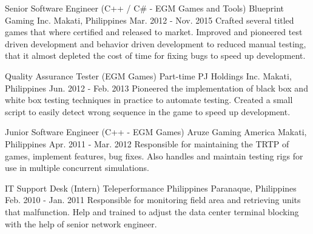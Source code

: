 \begin{cventries}
    \cventry
        {Senior Software Engineer (C++ / C\# - EGM Games and Tools)}
        {Blueprint Gaming Inc.}
        {Makati, Philippines}
        {Mar. 2012 - Nov. 2015}
        {Crafted several titled games that where certified and released to market. Improved and pioneered test driven development and behavior driven development to reduced manual testing, that it almost depleted the cost of time for fixing bugs to speed up development.}
        
    \cventry
        {Quality Assurance Tester (EGM Games) Part-time}
        {PJ Holdings Inc.}
        {Makati, Philippines}
        {Jun. 2012 - Feb. 2013}
        {Pioneered the implementation of black box and white box testing techniques in practice to automate testing. Created a small script to easily detect wrong sequence in the game to speed up development.}
        
    \cventry
        {Junior Software Engineer (C++ - EGM Games)}
        {Aruze Gaming America}
        {Makati, Philippines}
        {Apr. 2011 - Mar. 2012}
        {Responsible for maintaining the TRTP of games, implement features, bug fixes. Also handles and maintain testing rigs for use in multiple concurrent simulations.}

    \cventry
        {IT Support Desk (Intern)}
        {Teleperformance Philippines}
        {Paranaque, Philippines}
        {Feb. 2010 - Jan. 2011}
        {Responsible for monitoring field area and retrieving units that malfunction. Help and trained to adjust the data center terminal blocking with the help of senior network engineer.}

\end{cventries}